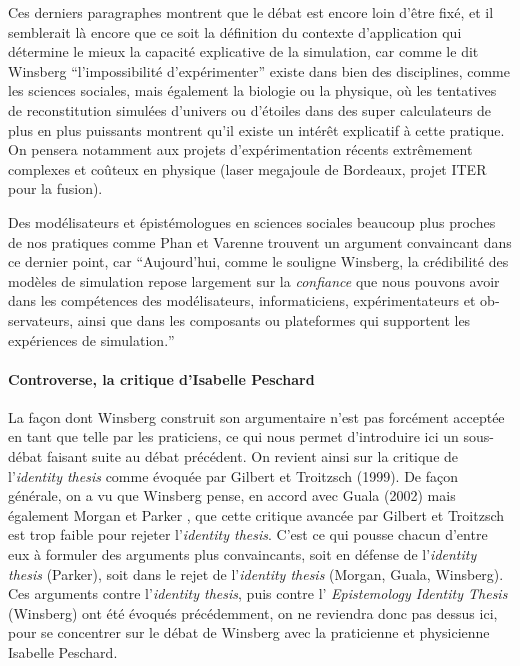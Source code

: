 Ces derniers paragraphes montrent que le débat est encore loin d'être fixé, et il semblerait là encore que ce soit la définition du contexte d'application qui détermine le mieux la capacité explicative de la simulation, car comme le dit Winsberg \enquote{l'impossibilité d'expérimenter} existe dans bien des disciplines, comme les sciences sociales, mais également la biologie ou la physique, où les tentatives de reconstitution simulées d'univers ou d'étoiles dans des super calculateurs de plus en plus puissants montrent qu'il existe un intérêt explicatif à cette pratique. On pensera notamment aux projets d'expérimentation récents extrêmement complexes et coûteux en physique (laser megajoule de Bordeaux, projet ITER pour la fusion).

Des modélisateurs et épistémologues en sciences sociales beaucoup plus proches de nos pratiques comme Phan et Varenne trouvent un argument convaincant dans ce dernier point, car \foreignquote{english}{Aujourd'hui, comme le souligne Winsberg, la crédibilité des modèles de simulation repose largement sur la \textit{confiance} que nous pouvons avoir dans les compétences des modélisateurs, informaticiens, expérimentateurs et observateurs, ainsi que dans les composants ou plateformes qui supportent les expériences de simulation.} \autocite{Phan2008}

\paragraph{Controverse, la critique d'Isabelle Peschard}

La façon dont Winsberg construit son argumentaire n'est pas forcément acceptée en tant que telle par les praticiens, ce qui nous permet d'introduire ici un sous-débat faisant suite au débat précédent. On revient ainsi sur la critique de l'\textit{identity thesis} comme évoquée par Gilbert et Troitzsch (1999). De façon générale, on a vu que Winsberg pense, en accord avec Guala (2002) \autocite{Winsberg2009} mais également Morgan et Parker \autocite{Winsberg2013}, que cette critique avancée par Gilbert et Troitzsch est trop faible pour rejeter l'\textit{identity thesis}. C'est ce qui pousse chacun d'entre eux à formuler des arguments plus convaincants, soit en défense de l'\textit{identity thesis} (Parker), soit dans le rejet de l'\textit{identity thesis} (Morgan, Guala, Winsberg). Ces arguments contre l'\textit{identity thesis}, puis contre l' \textit{Epistemology Identity Thesis} (Winsberg) ont été évoqués précédemment, on ne reviendra donc pas dessus ici, pour se concentrer sur le débat de Winsberg avec la praticienne et physicienne Isabelle Peschard.

